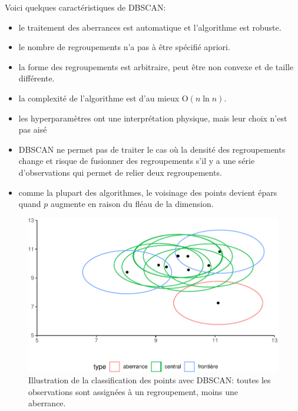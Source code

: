 \documentclass[
  11pt,
  letterpaper,
]{scrbook}
\providecommand{\tightlist}{%
  \setlength{\itemsep}{0pt}\setlength{\parskip}{0pt}}\usepackage{longtable,booktabs,array}
\theoremstyle{definition}
\theoremstyle{remark}
\begin{document}
Voici quelques caractéristiques de DBSCAN:

\begin{itemize}
\tightlist
\item
  le traitement des aberrances est automatique et l'algorithme est
  robuste.
\item
  le nombre de regroupements n'a pas à être spécifié apriori.
\item
  la forme des regroupements est arbitraire, peut être non convexe et de
  taille différente.
\item
  la complexité de l'algorithme est d'au mieux \(\mathrm{O}(n\ln n)\).
\item
  les hyperparamètres ont une interprétation physique, mais leur choix
  n'est pas aisé
\item
  DBSCAN ne permet pas de traiter le cas où la densité des regroupements
  change et risque de fusionner des regroupements s'il y a une série
  d'observations qui permet de relier deux regroupements.
\item
  comme la plupart des algorithmes, le voisinage des points devient
  épars quand \(p\) augmente en raison du fléau de la dimension.
\end{itemize}

\begin{figure}[ht!]

{\centering \includegraphics[width=1\textwidth,height=\textheight]{./03-regroupements_files/figure-pdf/fig-dbscan1-1.pdf}

}

\caption{\label{fig-dbscan1}Illustration de la classification des points
avec DBSCAN: toutes les observations sont assignées à un regroupement,
moins une aberrance.}

\end{figure}
\end{document}
